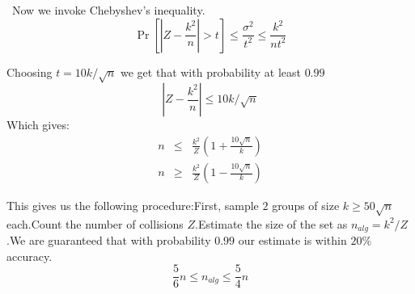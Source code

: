 \noindent  Now we invoke Chebyshev's inequality.\begin{equation}\Pr[|Z - \frac{k^2}{n}| > t] \le \frac{\sigma^2}{t^2} \le \frac{k^2}{nt^2}\end{equation}

\noindent Choosing $t = 10k/\sqrt{n}$ we get that with probability at least $0.99$\begin{equation}|Z - \frac{k^2}{n}| \le 10k/\sqrt{n}\end{equation}Which gives:\begin{eqnarray}n &\le& \frac{k^2}{Z}(1+\frac{10\sqrt{n}}{k}) \\n &\ge& \frac{k^2}{Z}(1-\frac{10\sqrt{n}}{k})\end{eqnarray}


\noindent This gives us the following procedure:First, sample $2$ groups of size $k \ge 50\sqrt{n}$ each.Count the number of collisions $Z$.Estimate the size of the set as $n_{alg} = k^2/Z$.We are guaranteed that with probability $0.99$ our estimate is within $20\%$ accuracy.\begin{equation}\frac{5}{6}n \le n_{alg} \le \frac{5}{4}n\end{equation}


